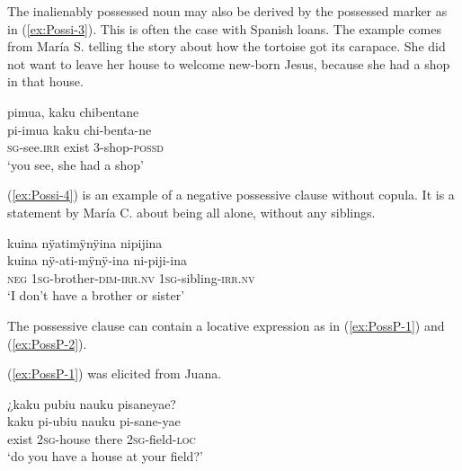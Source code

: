 The inalienably possessed noun may also be derived by the possessed marker as in (\ref{ex:Possi-3}). This is often the case with Spanish loans. The example comes from María S. telling the story about how the tortoise got its carapace. She did not want to leave her house to welcome new-born Jesus, because she had a shop in that house.

\ea\label{ex:Possi-3}
\begingl
\glpreamble pimua, kaku chibentane\\
\gla pi-imua kaku chi-benta-ne\\
\textsc{sg}-see.\textsc{irr} exist 3-shop-\textsc{possd}\\
\glft ‘you see, she had a shop’
\endgl
\trailingcitation{[rxx-n121128s.17]}
\xe



(\ref{ex:Possi-4}) is an example of a negative possessive clause without copula. It is a statement by María C. about being all alone, without any siblings.

\ea\label{ex:Possi-4}
\begingl
\glpreamble kuina nÿatimÿnÿina nipijina \\
\gla kuina nÿ-ati-mÿnÿ-ina ni-piji-ina\\
\glb \textsc{neg} 1\textsc{sg}-brother-\textsc{dim}-\textsc{irr.nv} 1\textsc{sg}-sibling-\textsc{irr.nv}\\
\glft ‘I don’t have a brother or sister’
\endgl
\trailingcitation{[uxx-p110825l.074]}
\xe

The possessive clause can contain a locative expression as in (\ref{ex:PossP-1}) and (\ref{ex:PossP-2}).

(\ref{ex:PossP-1}) was elicited from Juana.

\ea\label{ex:PossP-1}
\begingl 
\glpreamble ¿kaku pubiu nauku pisaneyae?\\
\gla kaku pi-ubiu nauku pi-sane-yae\\ 
\glb exist 2\textsc{sg}-house there 2\textsc{sg}-field-\textsc{loc}\\ 
\glft ‘do you have a house at your field?’\\ 
\endgl
\trailingcitation{[jmx-e090727s.352]}
\xe


